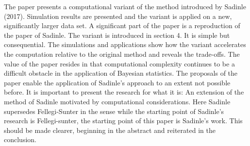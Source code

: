 \documentclass[letterpaper, parskip]{scrartcl}
\begin{document}
	The paper presents a computational variant of the method introduced by Sadinle (2017). Simulation
	results are presented and the variant is applied on a new, significantly larger data set.
	A significant part of the paper is a reproduction of the paper of Sadinle. The variant is introduced in
	section 4. It is simple but consequential. The simulations and applications show how the variant
	accelerates the computation relative to the original method and reveals the trade-offs.
	The value of the paper resides in that computational complexity continues to be a difficult obstacle in
	the application of Bayesian statistics. The proposals of the paper enable the application of Sadinle’s
	approach to an extent not possible before.
	It is important to present the research for what it is: An extension of the method of Sadinle motivated
	by computational considerations. Here Sadinle supersedes Fellegi-Sunter in the sense while the starting
	point of Sadinle’s research is Fellegi-sunter, the starting point of this paper is Sadinle’s work. This should
	be made clearer, beginning in the abstract and reiterated in the conclusion.
	
	
	
\end{document}
